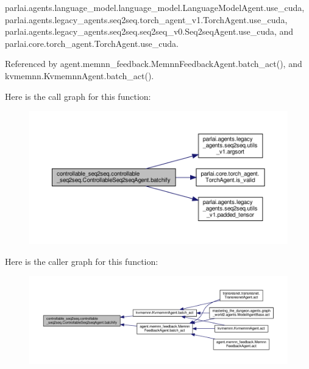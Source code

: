 parlai.\+agents.\+language\+\_\+model.\+language\+\_\+model.\+Language\+Model\+Agent.\+use\+\_\+cuda, parlai.\+agents.\+legacy\+\_\+agents.\+seq2seq.\+torch\+\_\+agent\+\_\+v1.\+Torch\+Agent.\+use\+\_\+cuda, parlai.\+agents.\+legacy\+\_\+agents.\+seq2seq.\+seq2seq\+\_\+v0.\+Seq2seq\+Agent.\+use\+\_\+cuda, and parlai.\+core.\+torch\+\_\+agent.\+Torch\+Agent.\+use\+\_\+cuda.



Referenced by agent.\+memnn\+\_\+feedback.\+Memnn\+Feedback\+Agent.\+batch\+\_\+act(), and kvmemnn.\+Kvmemnn\+Agent.\+batch\+\_\+act().

Here is the call graph for this function\+:
\nopagebreak
\begin{figure}[H]
\begin{center}
\leavevmode
\includegraphics[width=350pt]{classcontrollable__seq2seq_1_1controllable__seq2seq_1_1ControllableSeq2seqAgent_a5c1519c979bef4908400d72e4ea001fc_cgraph}
\end{center}
\end{figure}
Here is the caller graph for this function\+:
\nopagebreak
\begin{figure}[H]
\begin{center}
\leavevmode
\includegraphics[width=350pt]{classcontrollable__seq2seq_1_1controllable__seq2seq_1_1ControllableSeq2seqAgent_a5c1519c979bef4908400d72e4ea001fc_icgraph}
\end{center}
\end{figure}
\mbox{\label{classcontrollable__seq2seq_1_1controllable__seq2seq_1_1ControllableSeq2seqAgent_a9de6e4414354c8e879ea51231e44242e}} 
